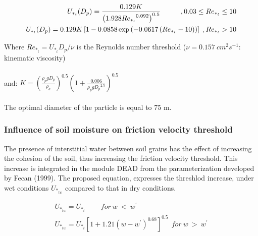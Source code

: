 \begin{eqnarray}
U_{*_{t}}(D_p) = \frac{0.129 K}{ { \left ( 1.928 {Re_{*_t}}^{0.092} \right ) }^{0.5}} \hspace{1cm}, 0.03\leq Re_{*_t} \leq 10 \\
U_{*_{t}}(D_p) = 0.129  K \left [ 1-0.0858 \exp \left ( -0.0617 \left ( Re_{*_t}-10 \right ) \right ) \right ] \hspace{0.1cm}, {Re_{*_t}} > 10 
\end{eqnarray}

Where $Re_{*_t} = U_{*_t} D_p / \nu$ is the Reynolds number threshold ($\nu = 0.157~cm^{2}s^{-1}$: kinematic viscosity) \\ \\
and: $K = \left ( \frac{\rho_{p} g D_p}{\rho_{a}} \right ) ^{0.5} \left ( 1+\frac{0.006}{\rho_{p} g {D_p}^{2.5}} \right ) ^{0.5}$ \\ \\
The optimal diameter of the particle is equal to 75 \textmu m.

\subsubsection{Influence of soil moisture on friction velocity threshold}

The presence of interstitial water between soil grains has the effect of increasing the
cohesion of the soil, thus increasing the friction velocity threshold. This increase is
integrated in the module DEAD from the parameterization developed by Fecan \etal (1999). 
The proposed equation, expresses the threshlod increase, under wet conditions $U_{*_{tw}}$
compared to that in dry conditions.


\begin{eqnarray}
U_{*_{tw}} = U_{*_{t}} ~~~~~~~~~~ for~ w ~ < ~ w^{'} \\
U_{*_{tw}} = U_{*_{t}} {\left [ 1+1.21(w-w^{'})^{0.68} \right ]} ^{0.5} ~~ for~ w ~ > ~ w^{'}
\end{eqnarray}



